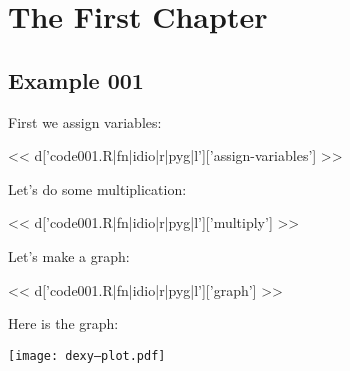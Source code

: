 \chapter{The First Chapter}

\section{Example 001}
First we assign variables:

<< d['code001.R|fn|idio|r|pyg|l']['assign-variables'] >>

Let's do some multiplication:

<< d['code001.R|fn|idio|r|pyg|l']['multiply'] >>

Let's make a graph:

<< d['code001.R|fn|idio|r|pyg|l']['graph'] >>

Here is the graph:

\texttt{[image: dexy--plot.pdf]}

